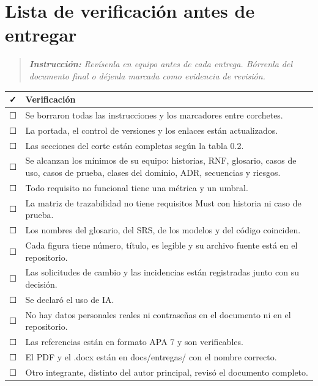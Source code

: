 \section{Lista de verificación antes de
entregar}\label{lista-de-verificaciuxf3n-antes-de-entregar}

\begin{quote}
\emph{\textbf{Instrucción:} Revísenla en equipo antes de cada entrega.
Bórrenla del documento final o déjenla marcada como evidencia de
revisión.}
\end{quote}

{\def\LTcaptype{none} %
\begin{longtable}[]{@{}
  >{\raggedright\arraybackslash}p{}
  >{\raggedright\arraybackslash}p{}@{}}
\toprule\noalign{}
\begin{minipage}[b]{\linewidth}\raggedright
\textbf{✓}
\end{minipage} & \begin{minipage}[b]{\linewidth}\raggedright
\textbf{Verificación}
\end{minipage} \\
\midrule\noalign{}
\endhead
\bottomrule\noalign{}
\endlastfoot
☐ & Se borraron todas las instrucciones y los marcadores entre
corchetes. \\
☐ & La portada, el control de versiones y los enlaces están
actualizados. \\
☐ & Las secciones del corte están completas según la tabla 0.2. \\
☐ & Se alcanzan los mínimos de su equipo: historias, RNF, glosario,
casos de uso, casos de prueba, clases del dominio, ADR, secuencias y
riesgos. \\
☐ & Todo requisito no funcional tiene una métrica y un umbral. \\
☐ & La matriz de trazabilidad no tiene requisitos Must con historia ni
caso de prueba. \\
☐ & Los nombres del glosario, del SRS, de los modelos y del código
coinciden. \\
☐ & Cada figura tiene número, título, es legible y su archivo fuente
está en el repositorio. \\
☐ & Las solicitudes de cambio y las incidencias están registradas junto
con su decisión. \\
☐ & Se declaró el uso de IA. \\
☐ & No hay datos personales reales ni contraseñas en el documento ni en
el repositorio. \\
☐ & Las referencias están en formato APA 7 y son verificables. \\
☐ & El PDF y el .docx están en docs/entregas/ con el nombre correcto. \\
☐ & Otro integrante, distinto del autor principal, revisó el documento
completo. \\
\end{longtable}
}
